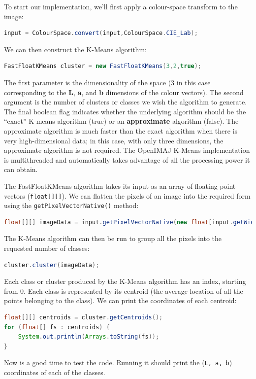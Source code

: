 \pagebreak
To start our implementation, we'll first apply a colour-space transform to the image:
\begin{lstlisting}[language=java]
input = ColourSpace.convert(input,ColourSpace.CIE_Lab);
\end{lstlisting}
We can then construct the K-Means algorithm:
\begin{lstlisting}[language=java]
FastFloatKMeans cluster = new FastFloatKMeans(3,2,true);
\end{lstlisting}
The first parameter is the dimensionality of the space (3 in this case corresponding 
to the \textbf{L}, \textbf{a}, and \textbf{b} dimensions of the colour vectors). The second 
argument is the number of clusters or classes we wish the algorithm to generate. The final 
boolean flag indicates whether the underlying algorithm should be the ``exact'' K-means algorithm (true) or an 
\textbf{approximate} algorithm (false). The approximate algorithm is much faster than the exact 
algorithm when there is very high-dimensional data; in this case, with only three dimensions, 
the approximate algorithm is not required. The OpenIMAJ K-Means implementation is 
multithreaded and automatically takes advantage of all the processing power it can obtain.

The FastFloatKMeans algorithm takes its input as an array of floating point vectors
(\verb+float[][]+). We can flatten the pixels of an image into the required form using the 
\verb+getPixelVectorNative()+ method:
\begin{lstlisting}[language=java]
float[][] imageData = input.getPixelVectorNative(new float[input.getWidth() * input.getHeight()][3]);
\end{lstlisting}
The K-Means algorithm can then be run to group all the pixels into the requested number of classes:
\begin{lstlisting}[language=java]
cluster.cluster(imageData);
\end{lstlisting}
Each class or cluster produced by the K-Means algorithm has an index, starting from 0. Each class is 
represented by its centroid (the average location of all the points belonging to the class). We can 
print the coordinates of each centroid:
\begin{lstlisting}[language=java]
float[][] centroids = cluster.getCentroids();
for (float[] fs : centroids) {
    System.out.println(Arrays.toString(fs));
}
\end{lstlisting}
Now is a good time to test the code. Running it should print the (\verb+L, a, b+) coordinates of each 
of the classes.

